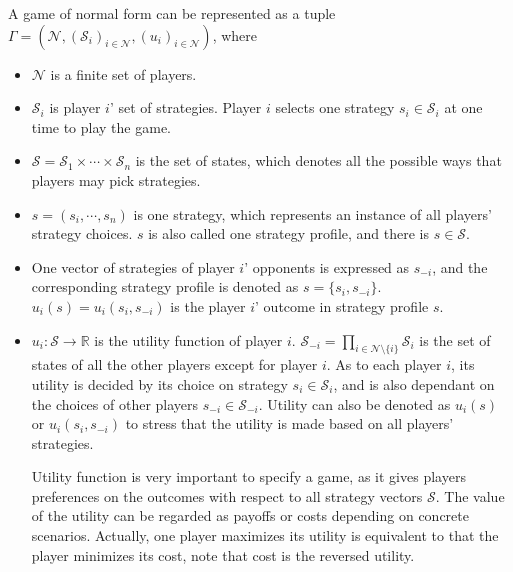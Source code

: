 A game of normal form can be represented as a tuple $\Gamma = (\mathcal{N}, (\mathcal{S}_i)_{i \in \mathcal{N}}, (u_i)_{i\in \mathcal{N}})$, where 
\begin{itemize}
\item $\mathcal{N}$ is a finite set of players.
\item $\mathcal{S}_i$ is player $i$' set of strategies.
Player $i$ selects one strategy $s_i\in \mathcal{S}_i$ at one time to play the game.
\item $\mathcal{S} = \mathcal{S}_1\times\cdots\times \mathcal{S}_n$ is the set of states, which denotes all the possible ways that players may pick strategies.

\item $s=(s_i,\cdots,s_n)$ is one strategy, which represents an instance of all players' strategy choices.
$s$ is also called one strategy profile, and there is $s\in \mathcal{S}$.

\item One vector of strategies of player $i$' opponents is expressed as $s_{-i}$, and the corresponding strategy profile is denoted as $s=\{s_i, s_{-i}\}$.
$u_i(s) = u_i(s_i, s_{-i})$ is the player $i$' outcome in strategy profile $s$.

\item $u_i:\mathcal{S}\rightarrow \mathbb{R} $ is the utility function of player $i$.
$\mathcal{S}_{-i}=\prod_{i\in \mathcal{N}\setminus \{i\}}\mathcal{S}_i$ is the set of states of all the other players except for player $i$.
As to each player $i$, its utility is decided by its choice on strategy $s_i\in \mathcal{S}_i$, and is also dependant on the choices of other players $s_{-i}\in \mathcal{S}_{-i}$.
Utility can also be denoted as $u_i(s)$ or $u_i(s_i,s_{-i})$ to stress that the utility is made based on all players' strategies.


Utility function is very important to specify a game, as it gives players preferences on the outcomes with respect to all strategy vectors $\mathcal{S}$.
The value of the utility can be regarded as payoffs or costs depending on concrete scenarios.
Actually, one player maximizes its utility is equivalent to that the player minimizes its cost, note that cost is the reversed utility.
\end{itemize}




